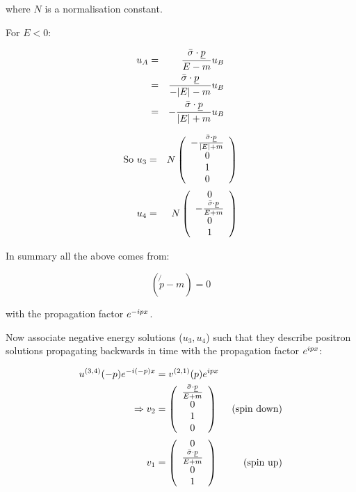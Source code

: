 where $N$ is a normalisation constant.

For $E<0$:

\begin{eqnarray*}
  u_A & = & \frac{\bar{\sigma}\cdot\underline{p}}{E - m}u_B \\
  & = & \frac{\bar{\sigma}\cdot\underline{p}}{-|E| - m}u_B \\
  & = & -\frac{\bar{\sigma}\cdot\underline{p}}{|E| + m}u_B
\end{eqnarray*}

\begin{eqnarray*}
  \textrm{So } u_3 & = & N
  \left(
    \begin{array}{c}
    -\frac{\bar{\sigma}\cdot\underline{p}}{|E| + m} \\
    0 \\
    1 \\
    0
    \end{array}
  \right)
  \\
  u_4 & = & N
  \left(
    \begin{array}{c}
    0 \\
    -\frac{\bar{\sigma}\cdot\underline{p}}{E + m} \\
    0 \\
    1
    \end{array}
  \right)
\end{eqnarray*}

In summary all the above comes from:

\[
  \left( \not{p} - m \right) = 0
\]

with the propagation factor $e^{-ipx}$.

Now associate negative energy solutions ($u_3,u_4$) such that they describe positron solutions propagating backwards in time with the propagation factor $e^{ipx}$:

\begin{eqnarray*}
  u^{(3,4)}(-p)e^{-i(-p)x} & = v^{(2,1)}(p)e^{ipx} \\
  \Rightarrow v_2 & =
  \left(
    \begin{array}{c}
    \frac{\bar{\sigma}\cdot\underline{p}}{E + m} \\
    0 \\
    1 \\
    0
    \end{array}
  \right)
  & \textrm{ (spin down)}
  \\
  v_1 & =
  \left(
    \begin{array}{c}
    0 \\
    \frac{\bar{\sigma}\cdot\underline{p}}{E + m} \\
    0 \\
    1
    \end{array}
  \right)
  & \textrm{ (spin up)}
\end{eqnarray*}

